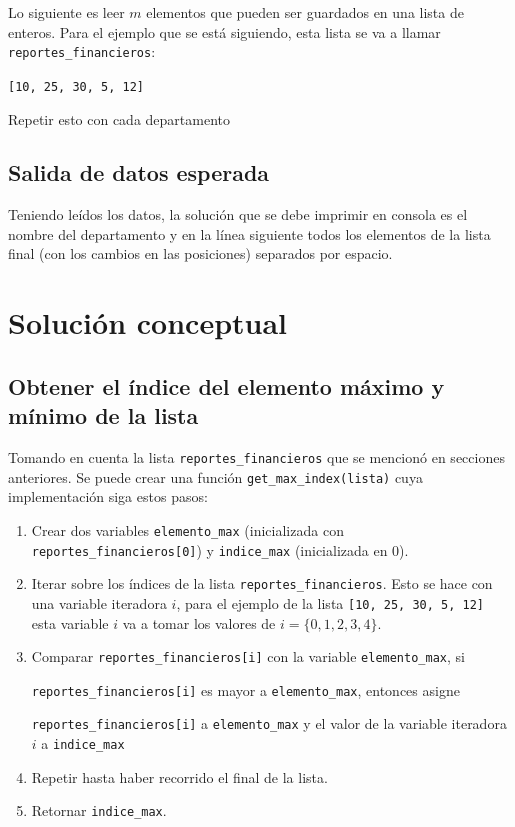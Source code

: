 \documentclass{article}
\begin{document}
Lo siguiente es leer \(m\) elementos que pueden ser guardados en una lista de enteros. Para el ejemplo que se está siguiendo, esta lista se va a llamar \texttt{reportes\_financieros}:

\texttt{[10, 25, 30, 5, 12]}

Repetir esto con cada departamento

\subsection{Salida de datos esperada}

Teniendo leídos los datos, la solución que se debe imprimir en consola es el nombre del departamento y en la línea siguiente todos los elementos de la lista final (con los cambios en las posiciones) separados por espacio. 

\section{Solución conceptual}

\subsection{Obtener el índice del elemento máximo y mínimo de la lista}
\label{sec:max-min}

Tomando en cuenta la lista \texttt{reportes\_financieros} que se mencionó en secciones anteriores. Se puede crear una función \texttt{get\_max\_index(lista)} cuya implementación siga estos pasos:

\begin{enumerate}
  \item Crear dos variables \texttt{elemento\_max} (inicializada con \texttt{reportes\_financieros[0]}) y \texttt{indice\_max} (inicializada en 0).
  \item Iterar sobre los índices de la lista \texttt{reportes\_financieros}. Esto se hace con una variable iteradora \(i\), para el ejemplo de la lista \texttt{[10, 25, 30, 5, 12]} esta variable \(i\) va a tomar los valores de \(i = \{ 0, 1, 2, 3, 4\}\).
  \item Comparar \texttt{reportes\_financieros[i]} con la variable \texttt{elemento\_max}, si

 \texttt{reportes\_financieros[i]} es mayor a \texttt{elemento\_max}, entonces asigne

 \texttt{reportes\_financieros[i]} a \texttt{elemento\_max} y el valor de la variable iteradora \(i\) a \texttt{indice\_max}
  \item Repetir hasta haber recorrido el final de la lista.
  \item Retornar \texttt{indice\_max}.
\end{enumerate}
\end{document}
